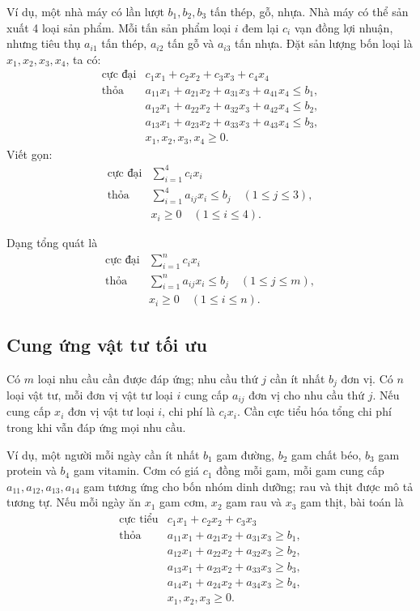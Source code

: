 \documentclass[11pt]{article}
\begin{document}
Ví dụ, một nhà máy có lần lượt $b_1,b_2,b_3$ tấn thép, gỗ, nhựa. Nhà máy có
thể sản xuất 4 loại sản phẩm. Mỗi tấn sản phẩm loại $i$ đem lại $c_i$ vạn
đồng lợi nhuận, nhưng tiêu thụ $a_{i1}$ tấn thép, $a_{i2}$ tấn gỗ và
$a_{i3}$ tấn nhựa. Đặt sản lượng bốn loại là $x_1,x_2,x_3,x_4$, ta có:
\[
\begin{array}{ll}
\text{cực đại} & c_1x_1+c_2x_2+c_3x_3+c_4x_4\\
\text{thỏa} &
a_{11}x_1+a_{21}x_2+a_{31}x_3+a_{41}x_4\le b_1,\\
&
a_{12}x_1+a_{22}x_2+a_{32}x_3+a_{42}x_4\le b_2,\\
&
a_{13}x_1+a_{23}x_2+a_{33}x_3+a_{43}x_4\le b_3,\\
& x_1,x_2,x_3,x_4\ge 0.
\end{array}
\]
Viết gọn:
\[
\begin{array}{ll}
\text{cực đại} & \displaystyle\sum_{i=1}^{4} c_ix_i\\
\text{thỏa} & \displaystyle\sum_{i=1}^{4} a_{ij}x_i\le b_j
              \quad (1\le j\le 3),\\
& x_i\ge 0\quad (1\le i\le 4).
\end{array}
\]

Dạng tổng quát là
\[
\begin{array}{ll}
\text{cực đại} & \displaystyle\sum_{i=1}^{n} c_ix_i\\
\text{thỏa} & \displaystyle\sum_{i=1}^{n} a_{ij}x_i\le b_j
              \quad (1\le j\le m),\\
& x_i\ge 0\quad (1\le i\le n).
\end{array}
\]

\subsection{Cung ứng vật tư tối ưu}

Có $m$ loại nhu cầu cần được đáp ứng; nhu cầu thứ $j$ cần ít nhất $b_j$ đơn
vị. Có $n$ loại vật tư, mỗi đơn vị vật tư loại $i$ cung cấp $a_{ij}$ đơn vị
cho nhu cầu thứ $j$. Nếu cung cấp $x_i$ đơn vị vật tư loại $i$, chi phí là
$c_ix_i$. Cần cực tiểu hóa tổng chi phí trong khi vẫn đáp ứng mọi nhu cầu.

Ví dụ, một người mỗi ngày cần ít nhất $b_1$ gam đường, $b_2$ gam chất béo,
$b_3$ gam protein và $b_4$ gam vitamin. Cơm có giá $c_1$ đồng mỗi gam, mỗi
gam cung cấp $a_{11},a_{12},a_{13},a_{14}$ gam tương ứng cho bốn nhóm dinh
dưỡng; rau và thịt được mô tả tương tự. Nếu mỗi ngày ăn $x_1$ gam cơm, $x_2$
gam rau và $x_3$ gam thịt, bài toán là
\[
\begin{array}{ll}
\text{cực tiểu} & c_1x_1+c_2x_2+c_3x_3\\
\text{thỏa} &
a_{11}x_1+a_{21}x_2+a_{31}x_3\ge b_1,\\
&
a_{12}x_1+a_{22}x_2+a_{32}x_3\ge b_2,\\
&
a_{13}x_1+a_{23}x_2+a_{33}x_3\ge b_3,\\
&
a_{14}x_1+a_{24}x_2+a_{34}x_3\ge b_4,\\
& x_1,x_2,x_3\ge 0.
\end{array}
\]
\end{document}
